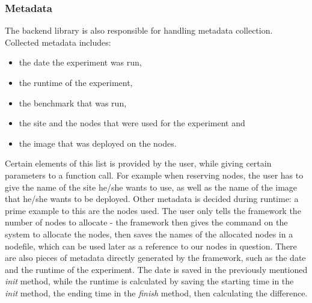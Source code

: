 \subsubsection{Metadata}
The backend library is also responsible for handling metadata
collection. Collected metadata includes:
\begin{itemize}
\item the date the experiment was run,
\item the runtime of the experiment,
\item the benchmark that was run,
\item the site and the nodes that were used for the experiment and
\item the image that was deployed on the nodes.
\end{itemize}
Certain elements of this list is provided by the user, while giving
certain parameters to a function call. For example when reserving
nodes, the user has to give the name of the site he/she wants to use,
as well as the name of the image that he/she wants to be
deployed. Other metadata is decided during runtime: a prime example to
this are the nodes used. The user only tells the framework the number
of nodes to allocate - the framework then gives the command on the
system to allocate the nodes, then saves the names of the allocated
nodes in a nodefile, which can be used later as a reference to our
nodes in question. There are also pieces of metadata directly
generated by the framework, such as the date and the runtime of the
experiment. The date is saved in the previously mentioned \emph{init}
method, while the runtime is calculated by saving the starting time in
the \emph{init} method, the ending time in the \emph{finish} method,
then calculating the difference.
